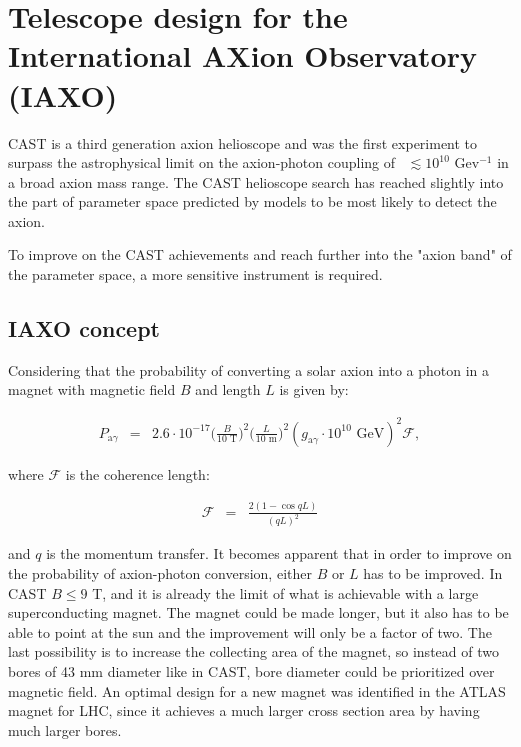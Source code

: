 \chapter{Telescope design for the International AXion Observatory (IAXO)}\label{chap:iaxo}

CAST is a third generation axion helioscope and was the first experiment to surpass the astrophysical limit on the axion-photon coupling of \gay\ $\lesssim 10^{10}$ Gev$^{-1}$ in a broad axion mass range. The CAST helioscope search has reached slightly into the part of parameter space predicted by models to be most likely to detect the axion.

To improve on the CAST achievements and reach further into the "axion band" of the parameter space, a more sensitive instrument is required.

\section{IAXO concept}
Considering that the probability of converting a solar axion into a photon in a magnet with magnetic field $B$ and length $L$ is given by\cite{Andriamonje:2007jc,Zioutas:2005jl,Sikivie:1983wx}:

\begin{eqnarray}
  P_{\text{a}\gamma} &=& 2.6\cdot10^{-17}\bigg(\frac{B}{10\text{ T}}\bigg)^2\bigg(\frac{L}{10\text{ m}}\bigg)^2(g_{\text{a}\gamma}\cdot10^{10}\text{\ GeV})^2\mathcal{F},
\end{eqnarray}

where $\mathcal{F}$ is the coherence length:

\begin{eqnarray}
  \mathcal{F} &=& \frac{2(1-\cos{qL})}{(qL)^2}
\end{eqnarray}

and $q$ is the momentum transfer. It becomes apparent that in order to improve on the probability of axion-photon conversion, either $B$ or $L$ has to be improved. In CAST $B \leq 9$ T, and it is already the limit of what is achievable with a large superconducting magnet. The magnet could be made longer, but it also has to be able to point at the sun and the improvement will only be a factor of two. The last possibility is to increase the collecting area of the magnet, so instead of two bores of 43 mm diameter like in CAST, bore diameter could be prioritized over magnetic field. An optimal design for a new magnet was identified\cite{Irastorza:1340820} in the ATLAS magnet for LHC\cite{Collaboration:1997vu}, since it achieves a much larger cross section area by having much larger bores.

